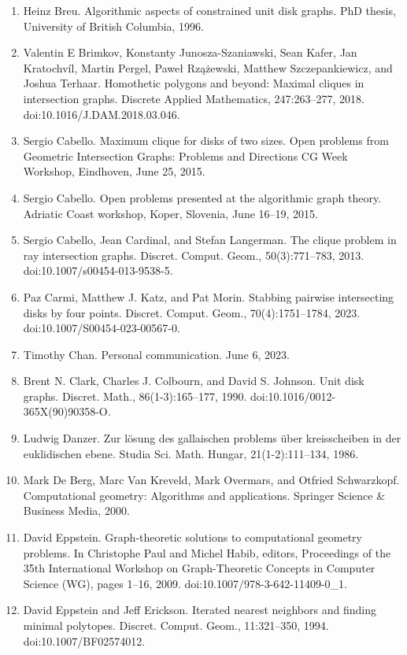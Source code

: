 \documentclass[10pt,a4paper]{amsart}
\begin{document}
\begin{enumerate}
\item[]  [9]  Heinz Breu.  Algorithmic aspects of constrained unit disk graphs.  PhD thesis, University of British Columbia, 1996.  
\item[]  [10]  Valentin E Brimkov, Konstanty Junosza-Szaniawski, Sean Kafer, Jan Kratochvíl, Martin Pergel, Paweł Rzążewski, Matthew Szczepankiewicz, and Joshua Terhaar.  Homothetic polygons and beyond: Maximal cliques in intersection graphs.  Discrete Applied Mathematics, 247:263–277, 2018.  doi:10.1016/J.DAM.2018.03.046.  
\item[]  [11]  Sergio Cabello.  Maximum clique for disks of two sizes.  Open problems from Geometric Intersection Graphs: Problems and Directions CG Week Workshop, Eindhoven, June 25, 2015.  
\item[]  [12]  Sergio Cabello.  Open problems presented at the algorithmic graph theory.  Adriatic Coast workshop, Koper, Slovenia, June 16–19, 2015.  
\item[]  [13]  Sergio Cabello, Jean Cardinal, and Stefan Langerman.  The clique problem in ray intersection graphs.  Discret. Comput. Geom., 50(3):771–783, 2013.  doi:10.1007/s00454-013-9538-5.  
\item[]  [14]  Paz Carmi, Matthew J. Katz, and Pat Morin.  Stabbing pairwise intersecting disks by four points.  Discret. Comput. Geom., 70(4):1751–1784, 2023.  doi:10.1007/S00454-023-00567-0.  
\item[]  [15]  Timothy Chan.  Personal communication.  June 6, 2023.  
\item[]  [16]  Brent N. Clark, Charles J. Colbourn, and David S. Johnson.  Unit disk graphs.  Discret. Math., 86(1-3):165–177, 1990.  doi:10.1016/0012-365X(90)90358-O.  
\item[]  [17]  Ludwig Danzer.  Zur lösung des gallaischen problems über kreisscheiben in der euklidischen ebene.  Studia Sci. Math. Hungar, 21(1-2):111–134, 1986.  
\item[]  [18]  Mark De Berg, Marc Van Kreveld, Mark Overmars, and Otfried Schwarzkopf.  Computational geometry: Algorithms and applications.  Springer Science \& Business Media, 2000.  
\item[]  [19]  David Eppstein.  Graph-theoretic solutions to computational geometry problems.  In Christophe Paul and Michel Habib, editors, Proceedings of the 35th International Workshop on Graph-Theoretic Concepts in Computer Science (WG), pages 1–16, 2009.  doi:10.1007/978-3-642-11409-0\_1.  
\item[]  [20]  David Eppstein and Jeff Erickson.  Iterated nearest neighbors and finding minimal polytopes.  Discret. Comput. Geom., 11:321–350, 1994.  doi:10.1007/BF02574012.  

\end{enumerate}
\end{document}
